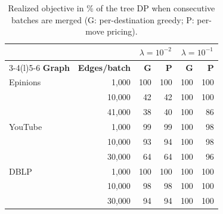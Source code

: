 \begin{table}[t]
\centering
\caption{Realized objective in \% of the tree DP when consecutive batches are merged (G: per-destination greedy; P: per-move pricing).}
\label{tab:sel-batch}
\begin{tabular*}{\linewidth}{@{\extracolsep{\fill}}lrrrrr@{}}
\toprule
 & & \multicolumn{2}{c}{$\lambda=10^{-2}$} & \multicolumn{2}{c}{$\lambda=10^{-1}$} \\
\cmidrule(lr){3-4}\cmidrule(l){5-6}
\textbf{Graph} & \textbf{Edges/batch} & \textbf{G} & \textbf{P} & \textbf{G} & \textbf{P} \\
\midrule
Epinions & 1{,}000 & 100 & 100 & 100 & 100 \\
 & 10{,}000 & 42 & 42 & 100 & 100 \\
 & 41{,}000 & 38 & 40 & 100 & 86 \\
YouTube & 1{,}000 & 99 & 99 & 100 & 98 \\
 & 10{,}000 & 93 & 94 & 100 & 98 \\
 & 30{,}000 & 64 & 64 & 100 & 96 \\
DBLP & 1{,}000 & 100 & 100 & 100 & 100 \\
 & 10{,}000 & 98 & 98 & 100 & 100 \\
 & 30{,}000 & 94 & 94 & 100 & 100 \\
\bottomrule
\end{tabular*}
\end{table}
